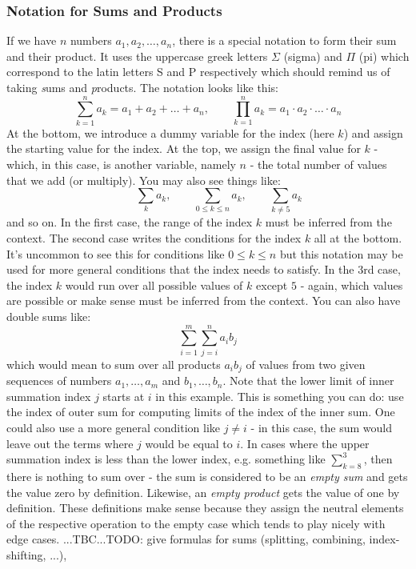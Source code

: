\subsubsection{Notation for Sums and Products}
If we have $n$ numbers $a_1, a_2, \ldots, a_n$, there is a special notation to form their sum and their product. It uses the uppercase greek letters $\Sigma$ (sigma) and $\Pi$ (pi) which correspond to the latin letters S and P respectively which should remind us of taking \emph{s}ums and \emph{p}roducts. The notation looks like this:
\begin{equation}
 \sum_{k=1}^{n}  a_k = a_1   +   a_2   +   \ldots   +   a_n, \qquad
 \prod_{k=1}^{n} a_k = a_1 \cdot a_2 \cdot \ldots \cdot a_n 
\end{equation}
At the bottom, we introduce a dummy variable for the index (here $k$) and assign the starting value for the index. At the top, we assign the final value for $k$ - which, in this case, is another variable, namely $n$ - the total number of values that we add (or multiply). You may also see things like:
\begin{equation}
 \qquad  \sum_{k} a_k,       \qquad
 \sum_{0 \leq k \leq n} a_k, \qquad
 \sum_{k \neq 5} a_k
\end{equation}
and so on. In the first case, the range of the index $k$ must be inferred from the context. The second case writes the conditions for the index $k$ all at the bottom. It's uncommon to see this for conditions like $0 \leq k \leq n$ but this notation may be used for more general conditions that the index needs to satisfy. In the 3rd case, the index $k$ would run over all possible values of $k$ except $5$ - again, which values are possible or make sense must be inferred from the context. You can also have double sums like:
\begin{equation}
 \sum_{i=1}^{m} \sum_{j=i}^n  a_i b_j
\end{equation}
which would mean to sum over all products $a_i b_j$ of values from two given sequences of numbers $a_1,\ldots,a_m$ and $b_1,\ldots,b_n$. Note that the lower limit of inner summation index $j$ starts at $i$ in this example. This is something you can do: use the index of outer sum for computing limits of the index of the inner sum. One could also use a more general condition like $j \neq i$ - in this case, the sum would leave out the terms where $j$ would be equal to $i$. In cases where the upper summation index is less than the lower index, e.g. something like $\sum_{k=8}^{3}$, then there is nothing to sum over - the sum is considered to be an \emph{empty sum} and gets the value zero by definition. Likewise, an \emph{empty product} gets the value of one by definition. These definitions make sense because they assign the neutral elements of the respective operation to the empty case which tends to play nicely with edge cases. ...TBC...TODO: give formulas for sums (splitting, combining, index-shifting, ...), 

